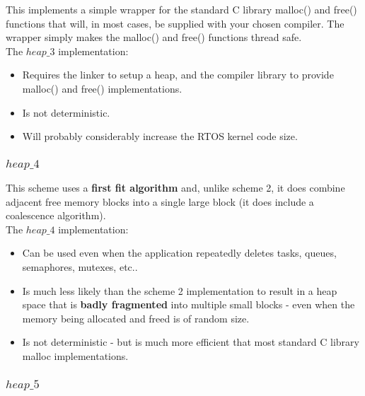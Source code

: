 \documentclass[12pt]{article}
\begin{document}
This implements a simple wrapper for the standard C library malloc() and free() functions that will, in most cases, be supplied with your chosen compiler. The wrapper simply makes the malloc() and free() functions thread safe.\\

The $heap\_3$ implementation:

\begin{itemize}
	\item Requires the linker to setup a heap, and the compiler library to provide malloc() and free() implementations.
	
	
	\item Is not deterministic.
		
	\item Will probably considerably increase the RTOS kernel code size.

\end{itemize}



\subsubsection{$heap\_4$}	

This scheme uses a \textbf{first fit algorithm} and, unlike scheme 2, it does combine adjacent free memory blocks into a single large block (it does include a coalescence algorithm).\\

The $heap\_4$ implementation:

\begin{itemize}
	\item Can be used even when the application repeatedly deletes tasks, queues, semaphores, mutexes, etc..	
	
	\item Is much less likely than the scheme 2 implementation to result in a heap space that is \textbf{badly fragmented} into multiple small blocks - even when the memory being allocated and freed is of random size.
		
	\item Is not deterministic - but is much more efficient that most standard C library malloc implementations.

\end{itemize}		



\subsubsection{$heap\_5$}	
\end{document}
